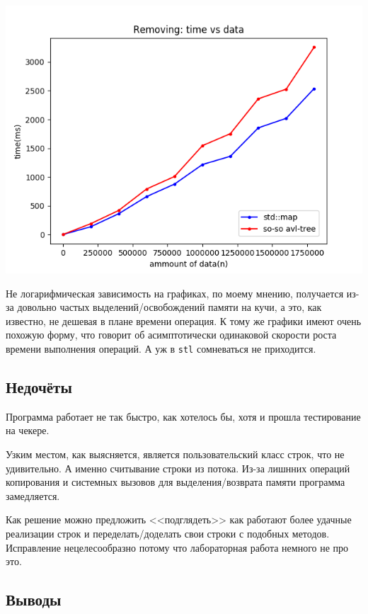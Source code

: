 \documentclass[12pt]{article}
\begin{document}
\begin{center}
    \includegraphics[width=\linewidth]{remove.png}
\end{center}

Не логарифмическая зависимость на графиках, по моему мнению, получается из-за довольно частых выделений/освобождений памяти на кучи, а это, как известно, не дешевая в плане времени операция.
К тому же графики имеют очень похожую форму, что говорит об асимптотически одинаковой скорости роста времени выполнения операций. А уж в \verb|stl| сомневаться не приходится.

\subsection*{Недочёты}

Программа работает не так быстро, как хотелось бы, хотя и прошла тестирование на чекере.

Узким местом, как выясняется, является пользовательский класс строк, что не удивительно. А именно считывание строки из потока. Из-за лишнних операций копирования и системных вызовов для выделения/возврата памяти программа замедляется.

Как решение можно предложить <<подглядеть>> как работают более удачные реализации строк и переделать/доделать свои строки с подобных методов.
Исправление нецелесообразно потому что лабораторная работа немного не про это.

\subsection*{Выводы}
\end{document}
